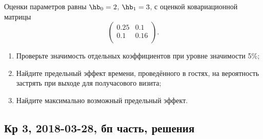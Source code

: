 \begin{enumerate}
Оценки параметров равны $\hb_0 =2$, $\hb_1 = 3$, с оценкой ковариационной матрицы
\[
\begin{pmatrix}
0.25 & 0.1 \\
0.1 & 0.16 \\
\end{pmatrix}.
\]

\begin{enumerate}
\item Проверьте значимость отдельных коэффициентов при уровне значимости 5\%;
\item Найдите предельный эффект времени, проведённого в гостях, на вероятность застрять при выходе для получасового визита;
\item Найдите максимально возможный предельный эффект.
\end{enumerate}
\end{enumerate}



\subsection{Кр 3, 2018-03-28, бп часть, решения}

